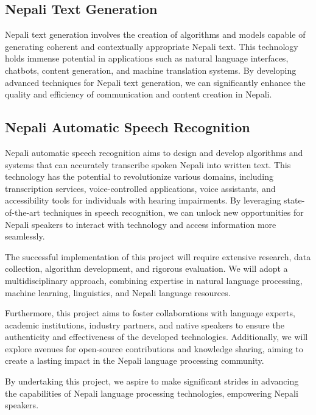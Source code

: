 \subsection{Nepali Text Generation}
Nepali text generation involves the creation of algorithms and models capable of generating coherent and contextually appropriate Nepali text. This technology holds immense potential in applications such as natural language interfaces, chatbots, content generation, and machine translation systems. By developing advanced techniques for Nepali text generation, we can significantly enhance the quality and efficiency of communication and content creation in Nepali.

\subsection{Nepali Automatic Speech Recognition}
Nepali automatic speech recognition aims to design and develop algorithms and systems that can accurately transcribe spoken Nepali into written text. This technology has the potential to revolutionize various domains, including transcription services, voice-controlled applications, voice assistants, and accessibility tools for individuals with hearing impairments. By leveraging state-of-the-art techniques in speech recognition, we can unlock new opportunities for Nepali speakers to interact with technology and access information more seamlessly.

The successful implementation of this project will require extensive research, data collection, algorithm development, and rigorous evaluation. We will adopt a multidisciplinary approach, combining expertise in natural language processing, machine learning, linguistics, and Nepali language resources.

Furthermore, this project aims to foster collaborations with language experts, academic institutions, industry partners, and native speakers to ensure the authenticity and effectiveness of the developed technologies. Additionally, we will explore avenues for open-source contributions and knowledge sharing, aiming to create a lasting impact in the Nepali language processing community.

By undertaking this project, we aspire to make significant strides in advancing the capabilities of Nepali language processing technologies, empowering Nepali speakers.

